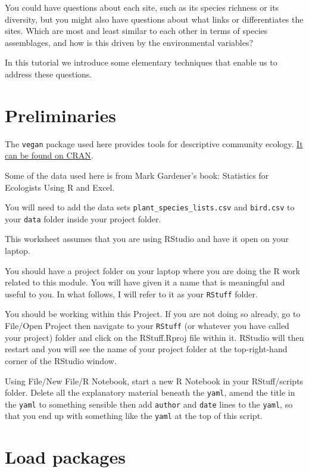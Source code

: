 \documentclass[
  letterpaper,
  DIV=11,
  numbers=noendperiod]{scrreprt}
\begin{document}
You could have questions about each site, such as its species richness
or its diversity, but you might also have questions about what links or
differentiates the sites. Which are most and least similar to each other
in terms of species assemblages, and how is this driven by the
environmental variables?

In this tutorial we introduce some elementary techniques that enable us
to address these questions.

\section{Preliminaries}\label{preliminaries-3}

The \texttt{vegan} package used here provides tools for descriptive
community ecology.
\href{https://cran.r-project.org/web/packages/vegan/index.html}{It can
be found on CRAN}.

Some of the data used here is from Mark Gardener's book: Statistics for
Ecologists Using R and Excel.

You will need to add the data sets \texttt{plant\_species\_lists.csv}
and \texttt{bird.csv} to your \texttt{data} folder inside your project
folder.

This worksheet assumes that you are using RStudio and have it open on
your laptop.

You should have a project folder on your laptop where you are doing the
R work related to this module. You will have given it a name that is
meaningful and useful to you. In what follows, I will refer to it as
your \texttt{RStuff} folder.

You should be working within this Project. If you are not doing so
already, go to File/Open Project then navigate to your \texttt{RStuff}
(or whatever you have called your project) folder and click on the
RStuff.Rproj file within it. RStudio will then restart and you will see
the name of your project folder at the top-right-hand corner of the
RStudio window.

Using File/New File/R Notebook, start a new R Notebook in your
RStuff/scripts folder. Delete all the explanatory material beneath the
\texttt{yaml}, amend the title in the \texttt{yaml} to something
sensible then add \texttt{author} and \texttt{date} lines to the
\texttt{yaml}, so that you end up with something like the \texttt{yaml}
at the top of this script.

\section{Load packages}\label{load-packages-6}
\end{document}
